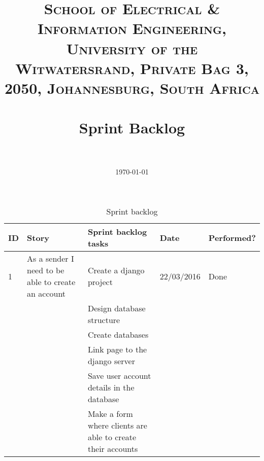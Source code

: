 \documentclass[paper=a4, fontsize=11pt]{scrartcl} %
\title{	
\normalfont \normalsize 
\textsc{School of Electrical \& Information Engineering, University of the
Witwatersrand, Private Bag 3, 2050, Johannesburg, South Africa} \\ [25pt] %
\horrule{0.5pt} \\[0.4cm] %
\huge Sprint Backlog \\ %
\horrule{2pt} \\[0.5cm] %
}
\author{} %
\date{\normalsize\today} %
\numberwithin{equation}{section} %
\numberwithin{figure}{section} %
\numberwithin{table}{section} %
\begin{document}
\maketitle %





\begin{table}[]
\centering
\caption{Sprint backlog}
\label{my-label}
\begin{tabular}{|p{1cm}|p{4cm}|p{4cm}|p{2cm}|p{2cm}|}
\hline
\textbf{ID} & \textbf{Story}                                                                  & \textbf{Sprint backlog tasks}                                                                      & \textbf{Date} & \textbf{Performed?} \\ \hline
1           & As a sender I need to be able to create an account                              & Create a django project                                                                            & 22/03/2016    & Done                \\ \hline
            &                                                                                 & Design database structure                                                                          &               &                     \\ \hline
            &                                                                                 & Create databases                                                                                   &               &                     \\ \hline
            &                                                                                 & Link page to the django server                                                                     &               &                     \\ \hline
            &                                                                                 & Save user account details in the database                                                          &               &                     \\ \hline
            &                                                                                 & Make a form where clients are able to create their accounts                                        &               &                     \\ \hline

\end{tabular}
\end{table}
\end{document}
